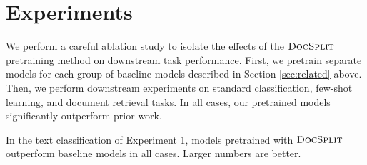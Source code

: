 \documentclass[11pt]{article}
\newcommand{\our}{\mbox{\textsc{DocSplit}}}
\newcommand{\ourbert}{$\our_{\mathrm{bert}}$}
\newcommand{\ourlong}{$\our_{\mathrm{long}}$}
\begin{document}
\section{Experiments}

\label{sec:experiments}


We perform a careful ablation study to isolate the effects of the $\our$ pretraining method on downstream task performance.
First, we pretrain separate models for each group of baseline models described in Section \ref{sec:related} above.
Then, we perform downstream experiments on standard classification, few-shot learning, and document retrieval tasks.
In all cases, our pretrained models significantly outperform prior work.



%
%
%
\begin{table}
    \centering
    
    \caption{
        In the text classification of Experiment 1, models pretrained with $\our$ outperform baseline models in all cases.
        Larger numbers are better.
    }
    \vspace{-3mm}
    \label{results}
\end{table}
\end{document}
